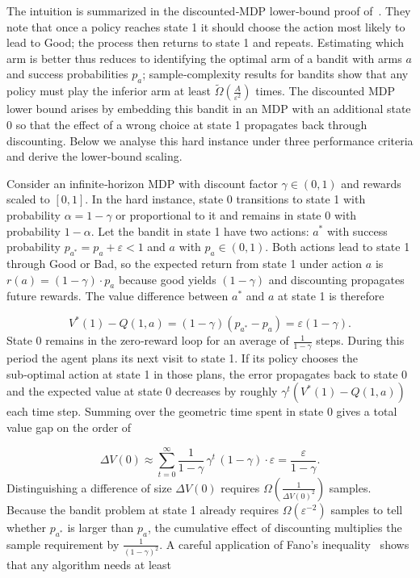 \documentclass{article}
\numberwithin{equation}{section}
\renewcommand{\epsilon}{\varepsilon}
\begin{document}
The intuition is summarized in the discounted‑MDP lower‑bound proof of~\cite{lattimore2012pac}. They note that once a policy reaches state 1 it should choose the action most likely to lead to Good; the process then returns to state 1 and repeats. Estimating which arm is better thus reduces to identifying the optimal arm of a bandit with arms $a$ and success probabilities $p_a$; sample‑complexity results for bandits show that any policy must play the inferior arm at least $\tilde\Omega\left(\tfrac{A}{\epsilon^2}\right)$ times. The discounted MDP lower bound arises by embedding this bandit in an MDP with an additional state 0 so that the effect of a wrong choice at state 1 propagates back through discounting. Below we analyse this hard instance under three performance criteria and derive the lower‑bound scaling.

Consider an infinite‑horizon MDP with discount factor $\gamma \in (0,1)$ and rewards scaled to $[0,1]$. In the hard instance, state 0 transitions to state 1 with probability {$\alpha = 1 - \gamma$ or proportional to it} and remains in state 0 with probability $1-\alpha$. Let the bandit in state 1 have two actions: $a^*$ with success probability {$p_{a^*} = p_a+\epsilon < 1$ and $a$ with $p_a\in (0, 1)$}. Both actions lead to state 1 through Good or Bad, so the expected return from state 1 under action $a$ is $r(a)=(1-\gamma)\cdot p_a$ because good yields {$(1 - \gamma)$} and discounting {propagates} future rewards. The value difference between $a^*$ and $a$ at state 1 is therefore

{$$V^{*}(1) - Q(1, a) = (1 - \gamma)(p_{a^*} - p_a) = \epsilon(1-\gamma).$$}
State 0 remains in the zero‑reward loop for an average of $\tfrac{1}{1-\gamma}$ steps. During this period the agent plans its next visit to state 1. If its policy chooses the sub‑optimal action at state 1 in those plans, the error propagates back to state 0 and the expected value at state 0 decreases by roughly $\gamma^{t}(V^*(1)-Q(1,a))$ each time step. Summing over the geometric time spent in state 0 gives a total value gap on the order of

{$$\Delta V(0)\approx \sum\limits_{t = 0}^{\infty}\frac{1}{1-\gamma}\,\gamma^{t}\,(1-\gamma)\cdot \epsilon = \frac{\epsilon}{1-\gamma}.$$}
Distinguishing a difference of size $\Delta V(0)$ requires $\Omega\left(\tfrac{1}{\Delta V(0)^2}\right)$ samples. Because the bandit problem at state 1 already requires $\Omega(\epsilon^{-2})$ samples to tell whether $p_{a^*}$ is larger than $p_a$, the cumulative effect of discounting multiplies the sample requirement by $\tfrac{1}{(1-\gamma)^2}$. A careful application of Fano’s inequality~\cite{yu1997assouad} shows that any algorithm needs at least
\end{document}
